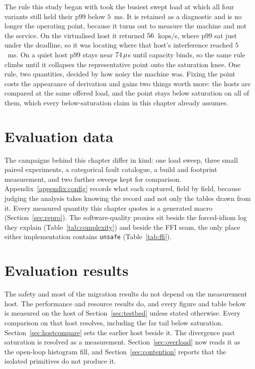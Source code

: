 \documentclass[english,oneside,a4paper,censored,csm,software-track-2020]{HYthesisML}
\begin{document}
The rule this study began with took the busiest swept load at which all four variants still held
their p99 below $5$~ms. It is retained as a diagnostic and is no longer the operating point, because
it turns out to measure the machine and not the service. On the virtualised host it returned
$56$~kops/s, where p99 sat just under the deadline, so it was locating where that
host's interference reached $5$~ms. On a quiet host p99 stays near $74\,\mu$s
until capacity binds, so the same rule climbs until it collapses the representative point onto the
saturation knee. One rule, two quantities, decided by how noisy the machine was. Fixing the point
costs the appearance of derivation and gains two things worth more: the hosts are compared at the same
offered load, and the point stays below saturation on all of them, which every below-saturation claim
in this chapter already assumes.

\section{Evaluation data}\label{sec:evaldata}
The campaigns behind this chapter differ in kind: one load sweep, three small paired experiments, a
categorical fault catalogue, a build and footprint measurement, and two further sweeps kept for
comparison. Appendix~\ref{appendix:config} records what each captured, field by field, because
judging the analysis takes knowing the record and not only the tables drawn from it. Every
measured quantity this chapter quotes is a generated macro (Section~\ref{sec:repro}). The
software-quality proxies sit beside the forced-idiom log they explain
(Table~\ref{tab:complexity}) and beside the FFI seam, the only place either implementation contains
\texttt{unsafe} (Table~\ref{tab:ffi}).

\section{Evaluation results}
The safety and most of the migration results do not depend on the measurement host. The
performance and resource results do, and every figure and table below is measured on the host of
Section~\ref{sec:testbed} unless stated otherwise. Every comparison on that host resolves, including
the far tail below saturation. Section~\ref{sec:hostcompare} sets the earlier host beside it.
The divergence past saturation is resolved as a measurement.
Section~\ref{sec:overload} now reads it as the open-loop histogram fill, and
Section~\ref{sec:contention} reports that the isolated primitives do not produce it.
\end{document}
